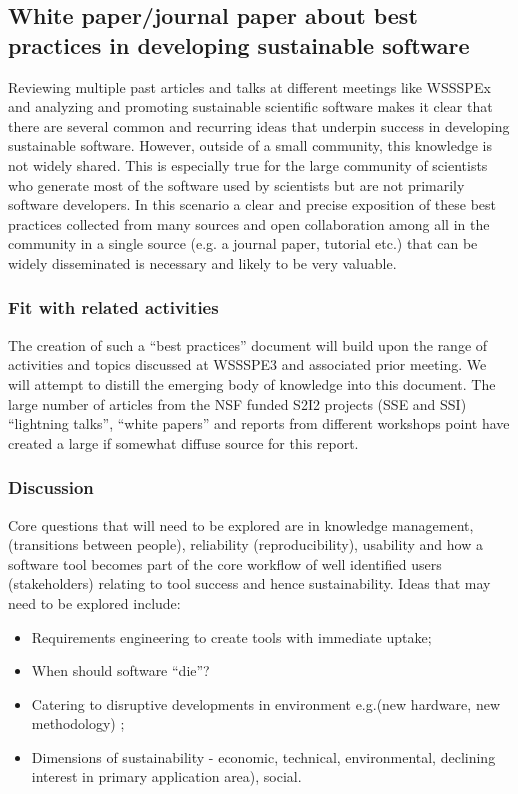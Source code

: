 \subsection{White paper/journal paper about best practices in developing sustainable software}
\label{sec:best-practices}

Reviewing multiple past articles and talks at different meetings like WSSSPEx\cite{WSSSPE papers, heroux paper, ...} and 
analyzing and promoting sustainable scientific software makes it clear that there 
are several common and recurring ideas that underpin success in developing sustainable software. However, outside of a small community, this knowledge is not widely
shared. This is  especially true for the large community of scientists who generate most of the software used by scientists but are not primarily software developers. In this
scenario a clear and precise exposition of these best practices collected from many sources and open collaboration among all in the community
in a single source (e.g. a journal paper, tutorial etc.)  that can be widely disseminated is necessary and likely to be very valuable.

\subsubsection{Fit with related activities}

The creation of such a ``best practices'' document will build upon the range of activities and topics discussed at WSSSPE3 and associated prior meeting. We will attempt to
distill the emerging body of knowledge into this document. The large number of  articles from the NSF funded S2I2 projects (SSE and SSI) ``lightning talks'', ``white papers''  and reports from different workshops point have created a large if somewhat diffuse source for this report.

\subsubsection{Discussion}

Core questions that will need to be explored are in knowledge management, 
(transitions between people), reliability (reproducibility), usability and how a software tool becomes part of the core workflow of well identified users (stakeholders)
relating to tool success and hence sustainability. Ideas 
that may need to be explored include:
\begin{itemize}
\item Requirements engineering to create tools with immediate uptake;
\item When should software ``die''?
\item Catering to disruptive developments in environment e.g.(new hardware, new methodology) ;
\item Dimensions of sustainability - economic, technical, environmental, 
declining interest in primary application area), social.
\end{itemize}

